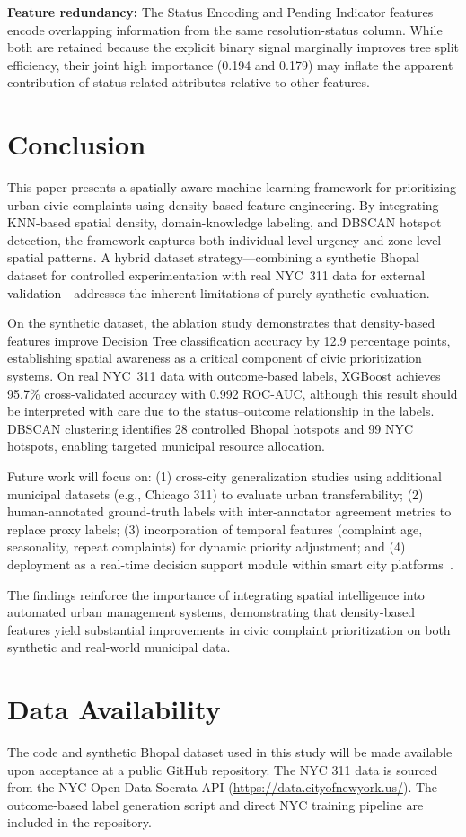 \documentclass[12pt,onecolumn,draftclsnofoot]{IEEEtran}
\begin{document}
\textbf{Feature redundancy:} The Status Encoding and Pending Indicator features encode overlapping information from the same resolution-status column. While both are retained because the explicit binary signal marginally improves tree split efficiency, their joint high importance (0.194 and 0.179) may inflate the apparent contribution of status-related attributes relative to other features.

\section{Conclusion}

This paper presents a spatially-aware machine learning framework for prioritizing urban civic complaints using density-based feature engineering. By integrating KNN-based spatial density, domain-knowledge labeling, and DBSCAN hotspot detection, the framework captures both individual-level urgency and zone-level spatial patterns. A hybrid dataset strategy---combining a synthetic Bhopal dataset for controlled experimentation with real NYC~311 data for external validation---addresses the inherent limitations of purely synthetic evaluation.

On the synthetic dataset, the ablation study demonstrates that density-based features improve Decision Tree classification accuracy by 12.9 percentage points, establishing spatial awareness as a critical component of civic prioritization systems. On real NYC~311 data with outcome-based labels, XGBoost achieves 95.7\% cross-validated accuracy with 0.992 ROC-AUC, although this result should be interpreted with care due to the status--outcome relationship in the labels. DBSCAN clustering identifies 28 controlled Bhopal hotspots and 99 NYC hotspots, enabling targeted municipal resource allocation.

Future work will focus on: (1) cross-city generalization studies using additional municipal datasets (e.g., Chicago 311) to evaluate urban transferability; (2) human-annotated ground-truth labels with inter-annotator agreement metrics to replace proxy labels; (3) incorporation of temporal features (complaint age, seasonality, repeat complaints) for dynamic priority adjustment; and (4) deployment as a real-time decision support module within smart city platforms~\cite{gharaibeh2017smart}.

The findings reinforce the importance of integrating spatial intelligence into automated urban management systems, demonstrating that density-based features yield substantial improvements in civic complaint prioritization on both synthetic and real-world municipal data.

\section*{Data Availability}
The code and synthetic Bhopal dataset used in this study will be made available upon acceptance at a public GitHub repository. The NYC 311 data is sourced from the NYC Open Data Socrata API (\url{https://data.cityofnewyork.us/}). The outcome-based label generation script and direct NYC training pipeline are included in the repository.



\end{document}

